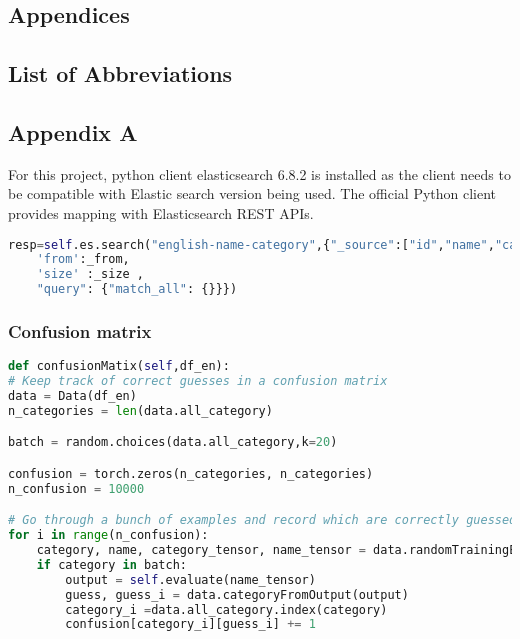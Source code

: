 

\begin{appendices}

\chapter*{Appendices}
\section{List of Abbreviations}

\section{Appendix A}
For this project, python client elasticsearch 6.8.2 is installed as the client needs to be compatible with Elastic search version being used. The official Python client provides mapping with Elasticsearch REST APIs.

\begin{lstlisting}[language=Python,caption={Elastic search},label={code:es_search}]
    resp=self.es.search("english-name-category",{"_source":["id","name","category"],
    'from':_from,
    'size' :_size ,
    "query": {"match_all": {}}})
    \end{lstlisting}

\subsection*{Confusion matrix}
\begin{lstlisting}[language=Python,caption={Confusion matrix},label={code:confusion matrix}]
def confusionMatix(self,df_en):
# Keep track of correct guesses in a confusion matrix
data = Data(df_en)
n_categories = len(data.all_category)

batch = random.choices(data.all_category,k=20)

confusion = torch.zeros(n_categories, n_categories)
n_confusion = 10000

# Go through a bunch of examples and record which are correctly guessed
for i in range(n_confusion):
    category, name, category_tensor, name_tensor = data.randomTrainingExample()
    if category in batch:
        output = self.evaluate(name_tensor)
        guess, guess_i = data.categoryFromOutput(output)
        category_i =data.all_category.index(category)
        confusion[category_i][guess_i] += 1


\end{lstlisting}
\end{appendices}
